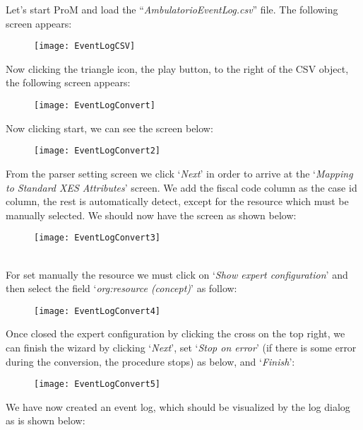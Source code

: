 \documentclass[paper=a4, fontsize=11pt]{scrartcl} %
\numberwithin{equation}{section} %
\numberwithin{figure}{section} %
\numberwithin{table}{section} %
\begin{document}
Let's start ProM and load the ``\textit{AmbulatorioEventLog.csv}'' file. The following screen appears:
\newpage
\begin{figure} [htbp]
\centering
\texttt{[image: EventLogCSV]}
\end{figure}
Now clicking the triangle icon, the play button, to the right of the CSV object, the following screen appears:
\begin{figure} [htbp]
\centering
\texttt{[image: EventLogConvert]}
\end{figure}
\newline
Now clicking start, we can see the screen below:
\begin{figure} [htbp]
\centering
\texttt{[image: EventLogConvert2]}
\end{figure}
\newpage
From the parser setting screen we click ‘\textit{Next}’ in order to arrive at the ‘\textit{Mapping to Standard XES Attributes}’ screen. We add the fiscal code column as the case id column, the rest is automatically detect, except for the resource which must be manually selected. We should now have the screen as shown below:
\begin{figure} [htbp]
\centering
\texttt{[image: EventLogConvert3]}
\end{figure}\\
For set manually the resource we must click on ‘\textit{Show expert configuration}’ and then select the field ‘\textit{org:resource (concept)}’ as follow:
\begin{figure} [htbp]
\centering
\texttt{[image: EventLogConvert4]}
\end{figure}
\newpage
Once closed the expert configuration by clicking the cross on the top right, we can finish the wizard by clicking ‘\textit{Next}’, set ‘\textit{Stop on error}’ (if there is some error during the conversion, the procedure stops) as below, and ‘\textit{Finish}’:
\begin{figure} [htbp]
\centering
\texttt{[image: EventLogConvert5]}
\end{figure}
\newpage
We have now created an event log, which should be visualized by the log dialog as is shown below:
\end{document}
